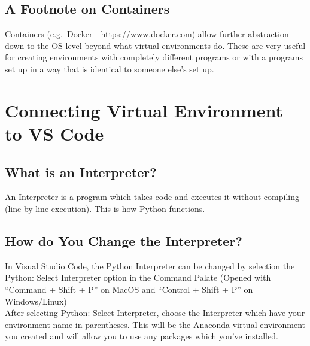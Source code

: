 \documentclass[12pt]{article}
\begin{document}
        \subsection{A Footnote on Containers}
            Containers (e.g.\ Docker - \url{https://www.docker.com}) allow further abstraction down to the OS level beyond what virtual environments do.
            These are very useful for creating environments with completely different programs or with a programs set up in a way that is identical to someone else's set up.
    \section{Connecting Virtual Environment to VS Code}
        \subsection{What is an Interpreter?}
            An Interpreter is a program which takes code and executes it without compiling (line by line execution). This is how Python functions.
        \subsection{How do You Change the Interpreter?}
            In Visual Studio Code, the Python Interpreter can be changed by selection the Python: Select Interpreter option in the Command Palate (Opened with ``Command + Shift + P'' on MacOS and ``Control + Shift + P'' on Windows/Linux)
            \\After selecting Python: Select Interpreter, choose the Interpreter which have your environment name in parentheses. This will be the Anaconda virtual environment you created and will allow you to use any packages which you've installed.
\end{document}
